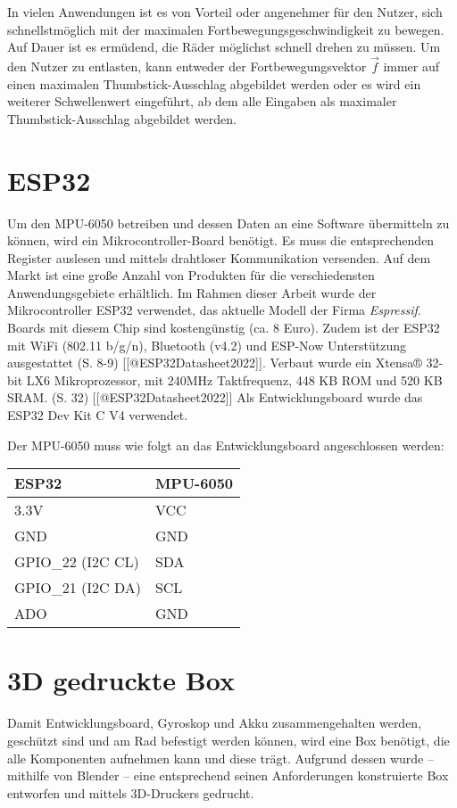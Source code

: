 In vielen Anwendungen ist es von Vorteil oder angenehmer für den Nutzer, sich schnellstmöglich mit der maximalen Fortbewegungsgeschwindigkeit zu bewegen.
Auf Dauer ist es ermüdend, die Räder möglichst schnell drehen zu müssen.
Um den Nutzer zu entlasten, kann entweder der Fortbewegungsvektor $\vec{f}$ immer auf einen maximalen Thumbstick-Ausschlag abgebildet werden oder es wird ein weiterer Schwellenwert eingeführt, ab dem alle Eingaben als maximaler Thumbstick-Ausschlag abgebildet werden.

\section{ESP32}
Um den MPU-6050 betreiben und dessen Daten an eine Software übermitteln zu können, wird ein Mikrocontroller-Board benötigt.
Es muss die entsprechenden Register auslesen und mittels drahtloser Kommunikation versenden.
Auf dem Markt ist eine große Anzahl von Produkten für die verschiedensten Anwendungsgebiete erhältlich.
Im Rahmen dieser Arbeit wurde der Mikrocontroller ESP32 verwendet, das aktuelle Modell der Firma \textit{Espressif}.
Boards mit diesem Chip sind kostengünstig (ca. 8 Euro).
Zudem ist der ESP32 mit WiFi (802.11 b/g/n), Bluetooth (v4.2) und ESP-Now Unterstützung ausgestattet (S. 8-9) [[@ESP32Datasheet2022]].
Verbaut wurde ein Xtensa® 32-bit LX6 Mikroprozessor, mit 240MHz Taktfrequenz, 448 KB ROM und 520 KB SRAM. (S. 32) [[@ESP32Datasheet2022]]
Als Entwicklungsboard wurde das ESP32 Dev Kit C V4 verwendet.

Der MPU-6050 muss wie folgt an das Entwicklungsboard angeschlossen werden:

\begin{table}[h]
    \centering
    \begin{tabular}{|l|l|}
        \hline
        ESP32             & MPU-6050 \\ \hline
        3.3V              & VCC      \\ \hline
        GND               & GND      \\ \hline
        GPIO\_22 (I2C CL) & SDA      \\ \hline
        GPIO\_21 (I2C DA) & SCL      \\ \hline
        ADO               & GND      \\ \hline
    \end{tabular}
\end{table}

\section{3D gedruckte Box}
Damit Entwicklungsboard, Gyroskop und Akku zusammengehalten werden, geschützt sind und am Rad befestigt werden können, wird eine Box benötigt, die alle Komponenten aufnehmen kann und diese trägt.
Aufgrund dessen wurde – mithilfe von Blender – eine entsprechend seinen Anforderungen konstruierte Box entworfen und mittels 3D-Druckers gedrucht.

